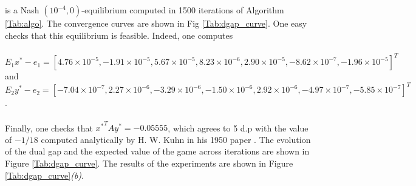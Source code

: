 \documentclass{article}
\begin{document}
is a Nash $(10^{-4},0)$-equilibrium computed in 1500 iterations of
Algorithm  \ref{Tab:algo}. The convergence curves are shown
in Fig \ref{Tab:dgap_curve}. One easy checks that this equilibrium is
feasible. Indeed, one computes \\\\
$E_1x^* - e_1 = [4.76 \times 10^{-5}, -1.91 \times 10^{-5}, 5.67
      \times 10^{-5}, 8.23 \times 10^{-6}, 2.90 \times 10^{-5},
      -8.62 \times 10^{-7}, -1.96 \times 10^{-5}]^T$
and
$E_2y^* - e_2 = [-7.04 \times 10^{-7}, 2.27 \times 10^{-6}, -3.29
  \times 10^{-6}, -1.50 \times 10^{-6},
      2.92 \times 10^{-6}, -4.97 \times 10^{-7}, -5.85 \times
      10^{-7}]^T$.\\\\
Finally, one checks that ${x^*}^TAy^* = {-0.05555}$,
 which agrees to 5 d.p with the value of $-1 / 18$ computed
 analytically by H. W. Kuhn in his 1950 paper \cite{kuhn}. The
 evolution of the dual gap and the expected value of
 the game across iterations are shown in Figure \ref{Tab:dgap_curve}.
The results of the experiments are shown in Figure
\ref{Tab:dgap_curve}\textit{(b)}.
\end{document}
